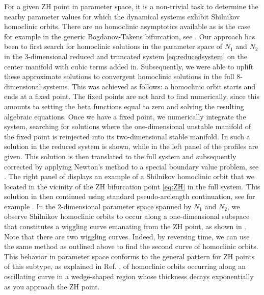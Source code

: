 For a given ZH point in parameter space, it is a non-trivial task to determine the nearby parameter values for which the dynamical systems exhibit Shilnikov homoclinic orbits. There are no homoclinic asymptotics available as is the case for example in the generic Bogdanov-Takens bifurcation, see \cite{Bosschaert@Interplay}. Our approach has been to first search for homoclinic solutions in the parameter space of $N_1$ and $N_2$ in the 3-dimensional reduced and truncated system \cref{eq:reducedsystem} on the center manifold  with cubic terms added in. Subsequently, we were able to uplift these approximate solutions to convergent homoclinic solutions in the full 8-dimensional systems.  This was achieved as follows: a homoclinic orbit starts and ends at a fixed point.  The fixed points are not hard to find numerically, since this amounts to setting the beta functions equal to zero and solving the resulting algebraic equations. Once we have a fixed point, we numerically integrate the system, searching for solutions where the one-dimensional unstable manifold of the fixed point is reinjected into its two-dimensional stable manifold. In  such a solution in the reduced system is shown, while in the left panel of  the profiles are given. This solution is then translated to the full system and subsequently corrected by applying Newton's method to a special boundary value problem, see \cite{DeWitte2012}. The right panel of  displays an example of a Shilnikov homoclinic orbit that we located in the vicinity of the ZH bifurcation point \cref{eq:ZH} in the full system.  This solution in then continued using standard pseudo-arclength continuation, see for example \cite{Beyn2002149}.  In the 2-dimensional parameter space spanned by $N_1$ and $N_2$, we observe Shilnikov homoclinic orbits to occur along a one-dimensional subspace that constitutes a wiggling curve emanating from the ZH point, as shown in . Note that there are two wiggling curves. Indeed, by reversing time, we can use the same method as outlined above to find the second curve of homoclinic orbits. This behavior in parameter space conforms to the general pattern for ZH points of this subtype, as explained in Ref. \cite{champneys2004entwined}, of homoclinic orbits occurring along an oscillating curve in a wedge-shaped region whose thickness decays exponentially as you approach the ZH point. 

